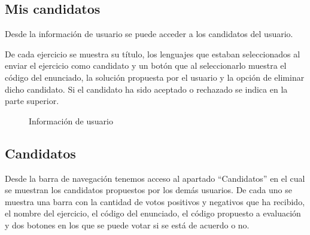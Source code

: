 \subsection{Mis candidatos}

Desde la información de usuario se puede acceder a los candidatos del usuario.

\vspace{1em}

De cada ejercicio se muestra su título, los lenguajes que estaban seleccionados al enviar el ejercicio como candidato y un botón que al seleccionarlo muestra el código del enunciado, la solución propuesta por el usuario y la opción de eliminar dicho candidato. Si el candidato ha sido aceptado o rechazado se indica en la parte superior.

\begin{figure}[H]
\begin{center}
\caption{Información de usuario\label{fig:usuario}}
\end{center}
\end{figure}

\subsection{Candidatos}

Desde la barra de navegación tenemos acceso al apartado ``Candidatos'' en el cual se muestran los candidatos propuestos por los demás usuarios. De cada uno se muestra una barra con la cantidad de votos positivos y negativos que ha recibido, el nombre del ejercicio, el código del enunciado, el código propuesto a evaluación y dos botones en los que se puede votar si se está de acuerdo o no.

